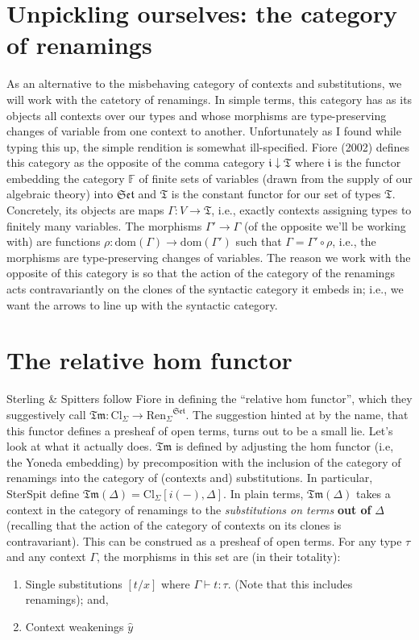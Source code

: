 \documentclass[11pt]{article}
\begin{document}
\section{Unpickling ourselves: the category of renamings}
\label{sec:orgf07bb7c}
As an alternative to the misbehaving category of contexts and substitutions, we
will work with the catetory of renamings. In simple terms, this category has as
its objects all contexts over our types and whose morphisms are type-preserving
changes of variable from one context to another. Unfortunately as I found while
typing this up, the simple rendition is somewhat ill-specified. Fiore (2002)
defines this category as the opposite of the comma category \(\mathfrak{i}
\downarrow \mathfrak{T}\) where \(\mathfrak{i}\) is the functor embedding the
category \(\mathbb{F}\) of finite sets of variables (drawn from the supply of
our algebraic theory) into \(\mathfrak{Set}\) and \(\mathfrak{T}\) is the
constant functor for our set of types \(\mathfrak{T}\). Concretely, its
objects are maps \(\Gamma : V \rightarrow \mathfrak{T}\), i.e., exactly
contexts assigning types to finitely many variables. The morphisms \(\Gamma'
\rightarrow \Gamma\) (of the opposite we'll be working with) are functions \(\rho : \text{dom}(\Gamma) \rightarrow \text{dom}(\Gamma')\) such that \(\Gamma
= \Gamma' \circ \rho\), i.e., the morphisms are type-preserving changes of
variables. The reason we work with the opposite of this category is so that the
action of the category of the renamings acts contravariantly on the clones of
the syntactic category it embeds in; i.e., we want the arrows to line up with
the syntactic category.

\section{The relative hom functor}
\label{sec:org29ac52e}
Sterling \& Spitters follow Fiore in defining the ``relative hom functor'', which
they suggestively call \(\mathfrak{Tm} : \text{Cl}_{\Sigma} \rightarrow
{\text{Ren}_\Sigma}^{\mathfrak{Set}}\). The suggestion hinted at by the name,
that this functor defines a presheaf of open terms, turns out to be a small lie.
Let's look at what it actually does. \(\mathfrak{Tm}\) is defined by adjusting
the hom functor (i.e, the Yoneda embedding) by precomposition with the inclusion
of the category of renamings into the category of (contexts and) substitutions.
In particular, SterSpit define \(\mathfrak{Tm}(\Delta) = \text{Cl}_{\Sigma}
[i(-), \Delta]\). In plain terms, \(\mathfrak{Tm}(\Delta)\) takes a context in
the category of renamings to the \emph{substitutions on terms} \textbf{out of} \(\Delta\)
(recalling that the action of the category of contexts on its clones is
contravariant). This can be construed as a presheaf of open terms. For any type
\(\tau\) and any context \(\Gamma\), the morphisms in this set are (in their
totality):
\begin{enumerate}
\item Single substitutions \([t / x]\) where \(\Gamma \vdash t : \tau\). (Note
that this includes renamings); and,
\item Context weakenings \(\hat{y}\)
\end{enumerate}
\end{document}
